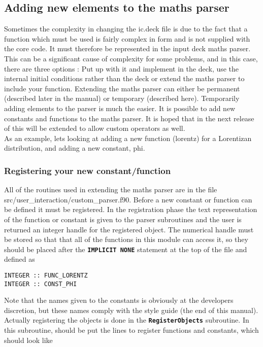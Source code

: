 \documentclass[12pt,a4paper]{article}
\newcommand{\simpleboxverbatim}{\begin{Verbatim}[obeytabs=true,frame=single,
  framerule=0.5mm,rulecolor=\color{warwickmid},formatcom=\color{black}]}
\newcommand{\inlinecode}[1]{{\color{warwickred} \bf\texttt{#1}}}
\newcommand{\EPOCH}{{\color{warwickdark}\fontfamily{phv}\selectfont{EPOCH}}}
\begin{document}
\subsection{Adding new elements to the maths parser}
Sometimes the complexity in changing the ic.deck file is due to the fact that
a function which must be used is fairly complex in form and is not supplied
with the core code. It must therefore be represented in the input deck maths
parser. This can be a significant cause of complexity for some problems, and
in this case, there are three options : Put up with it and implement in the
deck, use the internal initial conditions rather than the deck or extend the
maths parser to include your function. Extending the maths parser can either
be permanent (described later in the manual) or temporary (described
here). Temporarily adding elements to the parser is much the easier. It is
possible to add new constants and functions to the maths parser. It is hoped
that in the next release of {\EPOCH} this will be extended to allow custom
operators as well.\\

As an example, lets looking at adding a new function (lorentz) for a
Lorentizan distribution, and adding a new constant, phi.

\subsubsection{Registering your new constant/function}
All of the routines used in extending the maths parser are in the file
src/user\_interaction/custom\_parser.f90.  Before a new constant or function
can be defined it must be registered. In the registration phase the text
representation of the function or constant is given to the parser subroutines
and the user is returned an integer handle for the registered object. The
numerical handle must be stored so that that all of the functions in this
module can access it, so they should be placed after the \inlinecode{IMPLICIT
NONE} statement at the top of the file and defined as

\simpleboxverbatim
INTEGER :: FUNC_LORENTZ
INTEGER :: CONST_PHI
\end{Verbatim}

Note that the names given to the constants is obviously at the developers
discretion, but these names comply with the {\EPOCH} style guide (the end of
this manual). Actually registering the objects is done in the
\inlinecode{RegisterObjects} subroutine. In this subroutine, should be put the
lines to register functions and constants, which should look like
\end{document}
